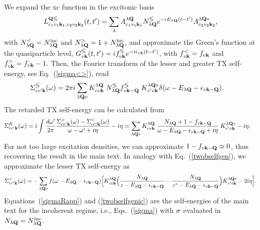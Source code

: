 \documentclass[twocolumn,aps,a4paper,superscriptaddress]{revtex4-2}
\begin{document}
\begin{widetext}
We expand the xc function in the excitonic
basis~\cite{perfetto_first-principles_2016,stefanucci_excitonic_2025}
\begin{align}
L^{{\mathbf Q}\lessgtr}_{c_{1}v_{1}{\mathbf k}_{1},c_{2}v_{2}{\mathbf k}_{2}}(t,t')
=\sum_{\lambda}A^{\lambda{\mathbf Q}}_{c_{1}v_{1}{\mathbf k}_{1}}
N^{\lessgtr}_{\lambda{\mathbf Q}}e^{-iE_{\lambda{\mathbf Q}}(t-t')}
A^{\lambda{\mathbf Q}\ast}_{c_{2}v_{2}{\mathbf k}_{2}},
\end{align}
with $N^{<}_{\lambda{\mathbf Q}}=N^{\rm inc}_{\lambda{\mathbf Q}}$ and
$N^{>}_{\lambda{\mathbf Q}}=1+N^{\rm inc}_{\lambda{\mathbf Q}}$, and approximate the
Green's function at the quasiparticle level,
$G^{\lessgtr}_{v{\mathbf k}}(t,t')=if^{\lessgtr}_{v{\mathbf k}}e^{-i\epsilon_{v{\mathbf k}}(t-t')}$,
with $f^{<}_{v{\mathbf k}}=f_{v{\mathbf k}}$ and $f^{>}_{v{\mathbf k}}=f_{v{\mathbf k}}-1$.
Then, the Fourier transform of the lesser and greater TX self-energy,
see Eq.~(\ref{sigma<>}),
read
\begin{align}
\Sigma^{\lessgtr}_{cc'{\mathbf k}}(\omega)&=2\pi i
\sum_{\lambda{\mathbf Q} v}K^{\lambda{\mathbf Q}}_{cv{\mathbf k}}\;N^{\lessgtr}_{\lambda{\mathbf Q}}
f^{\lessgtr}_{v{\mathbf k}-{\mathbf Q}}\;
K^{\lambda{\mathbf Q}\ast}_{c'v{\mathbf k}}
 \delta(\omega-E_{\lambda{\mathbf Q}}-\epsilon_{v{\mathbf k}-{\mathbf Q}}).
\label{sigma3}
\end{align}
The retarded TX self-energy can be calculated from
\begin{align}
\Sigma^{R}_{cc'{\mathbf k}}(\omega)&=i\int\frac{d\omega'}{2\pi}
\frac{\Sigma^{>}_{cc'{\mathbf k}}(\omega)-\Sigma^{<}_{cc'{\mathbf k}}(\omega)}{\omega-\omega'+i\eta}-i\eta
=\sum_{\lambda{\mathbf Q} v}K^{\lambda{\mathbf Q}}_{cv{\mathbf k}}\;
\frac{N_{\lambda{\mathbf Q}}+1-f_{v{\mathbf k}-{\mathbf Q}}}{\omega-E_{\lambda{\mathbf Q}}-\epsilon_{v{\mathbf k}-{\mathbf Q}}+i\eta}\;
K^{\lambda{\mathbf Q}\ast}_{c'v{\mathbf k}}-i\eta.
\label{sigmaRapp}
\end{align}
For not too large excitation densities, we can approximate
$1-f_{v{\mathbf k}-{\mathbf Q}}\simeq 0$, thus recovering the result in the main
text.
In analogy with Eq.~(\ref{twobselfgen}), we approximate the lesser TX self-energy
as
\begin{align}
\Sigma^{<}_{cc'{\mathbf k}}(\omega)=- \sum_{\lambda{\mathbf Q} v}
f(\omega-E_{\lambda{\mathbf Q}}-\epsilon_{v{\mathbf k}-{\mathbf Q}})
\Big[K^{\lambda{\mathbf Q}}_{cv{\mathbf k}}\Big(\frac{N_{\lambda{\mathbf Q}}}{z-E_{\lambda{\mathbf Q}}-\epsilon_{v{\mathbf k}-{\mathbf Q}}}
-\frac{N_{\lambda{\mathbf Q}}}{z^{\ast}-E_{\lambda{\mathbf Q}}-\epsilon_{v{\mathbf k}-{\mathbf Q}}}\Big)
K^{\lambda{\mathbf Q}\ast}_{c'v{\mathbf k}}-2i\eta\Big].
\label{twobselfgenic}
\end{align}
Equations~(\ref{sigmaRapp}) and (\ref{twobselfgenic}) are the
self-energies of the main text for the incoherent regime, i.e.,
Eqs.~(\ref{sigma}) with $\sigma$ evaluated in
$N_{\lambda{\mathbf Q}}=N_{\lambda{\mathbf Q}}^{\rm inc}$.


\end{widetext}
\end{document}
